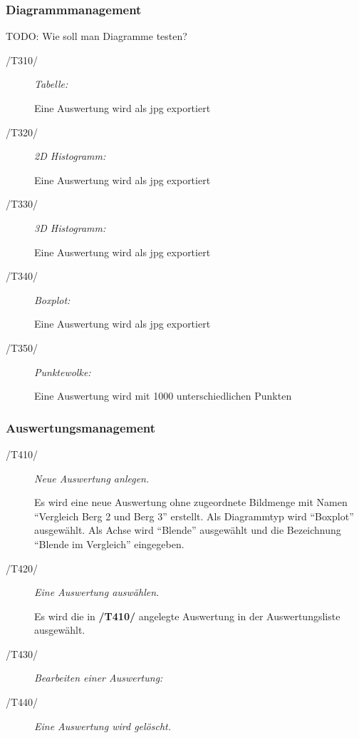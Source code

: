 	\subsubsection{Diagrammmanagement}

		TODO: Wie soll man Diagramme testen?	
	
		\begin{description}
			
			\item[/T310/] \textit{Tabelle:}\par 
				Eine Auswertung wird als \gls{jpg} exportiert

			\item[/T320/] \textit{2D Histogramm:}\par
				Eine Auswertung wird als \gls{jpg} exportiert 
		
			\item[/T330/] \textit{3D Histogramm:}\par
				Eine Auswertung wird als \gls{jpg} exportiert 

			\item[/T340/] \textit{Boxplot:}\par
				Eine Auswertung wird als \gls{jpg} exportiert 

			\item[/T350/] \textit{Punktewolke:}\par
				Eine Auswertung wird mit 1000 unterschiedlichen Punkten 

		\end{description}
	
	\subsubsection{Auswertungsmanagement}

		\begin{description}
		
			\item[/T410/] \textit{Neue Auswertung anlegen.}\par Es wird eine neue Auswertung ohne zugeordnete Bildmenge mit Namen "`Vergleich Berg 2 und Berg 3"' erstellt. Als Diagrammtyp wird "`Boxplot"' ausgewählt. Als Achse wird "`Blende"' ausgewählt und die Bezeichnung "`Blende im Vergleich"' eingegeben.
			
			\item[/T420/] \textit{Eine Auswertung auswählen.}\par Es wird die in \textbf{/T410/} angelegte Auswertung in der Auswertungsliste ausgewählt.
			
			\item[/T430/] \textit{Bearbeiten einer Auswertung:}\par 
				
			\item[/T440/] \textit{Eine Auswertung wird gelöscht.}\par
							
		\end{description}
	
